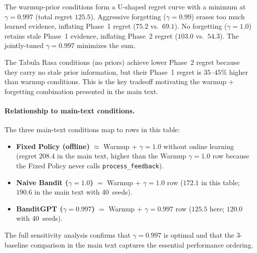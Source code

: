 \noindent
The warmup-prior conditions form a U-shaped regret curve with
a minimum at $\gamma{=}0.997$ (total regret $125.5$).
Aggressive forgetting ($\gamma{=}0.99$) erases too much learned
evidence, inflating Phase~1 regret ($75.2$ vs.\ $69.1$).
No forgetting ($\gamma{=}1.0$) retains stale Phase~1 evidence,
inflating Phase~2 regret ($103.0$ vs.\ $54.3$).
The jointly-tuned $\gamma{=}0.997$ minimizes the sum.

The Tabula Rasa conditions (no priors) achieve lower Phase~2
regret because they carry no stale prior information, but their
Phase~1 regret is $35$--$45\%$ higher than warmup conditions.
This is the key tradeoff motivating the warmup + forgetting
combination presented in the main text.

\paragraph{Relationship to main-text conditions.}
The three main-text conditions map to rows in this table:
\begin{itemize}[nosep,leftmargin=*]
  \item \textbf{Fixed Policy (offline)} $\approx$ Warmup +
    $\gamma{=}1.0$ without online learning (regret $208.4$
    in the main text, higher than the Warmup $\gamma{=}1.0$ row
    because the Fixed Policy never calls \texttt{process\_feedback}).
  \item \textbf{Naive Bandit ($\gamma{=}1.0$)} $=$ Warmup +
    $\gamma{=}1.0$ row ($172.1$ in this table; $190.6$ in the
    main text with 40~seeds).
  \item \textbf{BanditGPT ($\gamma{=}0.997$)} $=$ Warmup +
    $\gamma{=}0.997$ row ($125.5$ here; $120.0$ with 40~seeds).
\end{itemize}

\noindent
The full sensitivity analysis confirms that $\gamma{=}0.997$ is
optimal and that the 3-baseline comparison in the main text
captures the essential performance ordering.
